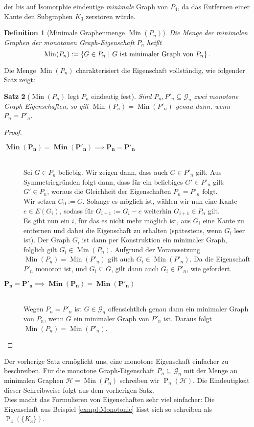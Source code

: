 \documentclass[10pt,a4paper]{scrreprt}
\newtheorem{definition}{Definition}
\newtheorem{Satz}[definition]{Satz}
\theoremstyle{definition}
\DeclareMathOperator\Min{Min}
\begin{document}
der bis auf Isomorphie eindeutige \emph{minimale} 
Graph von $P_4$, da das Entfernen einer Kante
den Subgraphen $K_3$ zerstören würde.

\begin{definition}[Minimale Graphenmenge $\Min(P_n)$]
Die Menge der minimalen Graphen der monotonen Graph-Eigenschaft
$P_n$ heißt
$$\Min(P_n) := \{ G\in P_n \ | \ G \textup{ ist minimaler Graph von } P_n\}\,.$$
\end{definition}

Die Menge $\Min(P_n)$ charakterisiert die
Eigenschaft vollständig, wie folgender Satz zeigt:

\begin{Satz}[$\Min(P_n)$ legt $P_n$ eindeutig fest]
Sind $P_n, P'_n \subseteq \mathcal{G}_n$ zwei monotone 
Graph-Eigenschaften, so gilt
$\Min(P_n) = \Min(P'_n)$ genau dann, wenn $P_n = P'_n$.
\end{Satz}
\begin{proof} \hfill
\begin{description}
\item[$\boldsymbol{\Min(P_n) = \Min(P'_n) \implies P_n = P'_n}$]
\hfill \\
Sei $G \in P_n$ beliebig. Wir zeigen dann, dass auch $G \in P'_n$
gilt. Aus Symmetriegründen folgt dann, dass für ein beliebiges 
$G' \in P'_n$ gilt: $G' \in P_n$, woraus die Gleichheit der
Eigenschaften $P_n = P'_n$ folgt. \\
Wir setzen $G_0 := G$. Solange es möglich ist, wählen wir nun
eine Kante $e \in E(G_i)$, sodass für $G_{i+1} := G_i - e$  
weiterhin $G_{i+1} \in P_n$ gilt. \\
Es gibt nun ein $i$, für das es nicht mehr möglich ist,
aus $G_i$ eine Kante zu entfernen und dabei die Eigenschaft
zu erhalten (spätestens, wenn $G_i$ leer ist).
Der Graph $G_i$ ist dann per Konstruktion ein minimaler
Graph, folglich gilt $G_i \in \Min(P_n)$. Aufgrund der
Voraussetzung $\Min(P_n) = \Min(P'_n)$ gilt auch 
$G_i \in \Min(P'_n)$. Da die Eigenschaft $P'_n$ monoton ist,
und $G_i \subseteq G$, gilt dann auch $G_i \in P'_n$,
wie gefordert.
\item[$\boldsymbol{P_n = P'_n \implies \Min(P_n) = \Min(P'_n)}$]
\hfill \\
Wegen $P_n = P'_n$ ist $G \in \mathcal{G}_n$ offensichtlich
genau dann ein minimaler Graph von $P_n$, wenn $G$ ein 
minimaler Graph von $P'_n$ ist. Daraus folgt 
$\Min(P_n) = \Min(P'_n)$. \qedhere
\end{description}
\end{proof}
Der vorherige Satz ermöglicht uns, eine
monotone Eigenschaft einfacher zu beschreiben. 
Für die monotone Graph-Eigenschaft $P_n\subseteq \mathcal{G}_n$
mit der Menge an minimalen Graphen $\mathcal{H} = \Min(P_n)$
schreiben wir $\operatorname{P}_n(\mathcal{H})$. Die Eindeutigkeit dieser
Schreibweise folgt aus dem vorherigen Satz. \\
Dies macht das Formulieren von Eigenschaften sehr viel einfacher:
Die Eigenschaft aus Beispiel \ref{exmpl:Monotonie} lässt sich
so schreiben als $\operatorname{P}_4(\{K_3\})$.
\end{document}
